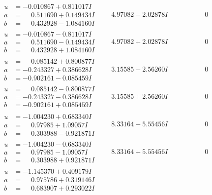 \documentclass[1p]{elsarticle_modified}
\theoremstyle{definition}
\begin{document}
$$\begin{array}{c|c|c}
\begin{aligned}
u &= -0.010867 + 0.811017 I \\
a &= \phantom{-}0.511690 + 0.149434 I \\
b &= \phantom{-}0.432928 - 1.084160 I\end{aligned}
 & \phantom{-}4.97082 - 2.02878 I & \phantom{-0.000000 } 0 \\ \hline\begin{aligned}
u &= -0.010867 - 0.811017 I \\
a &= \phantom{-}0.511690 - 0.149434 I \\
b &= \phantom{-}0.432928 + 1.084160 I\end{aligned}
 & \phantom{-}4.97082 + 2.02878 I & \phantom{-0.000000 } 0 \\ \hline\begin{aligned}
u &= \phantom{-}0.085142 + 0.800877 I \\
a &= -0.243327 + 0.386628 I \\
b &= -0.902161 - 0.085459 I\end{aligned}
 & \phantom{-}3.15585 - 2.56260 I & \phantom{-0.000000 } 0 \\ \hline\begin{aligned}
u &= \phantom{-}0.085142 - 0.800877 I \\
a &= -0.243327 - 0.386628 I \\
b &= -0.902161 + 0.085459 I\end{aligned}
 & \phantom{-}3.15585 + 2.56260 I & \phantom{-0.000000 } 0 \\ \hline\begin{aligned}
u &= -1.004230 + 0.683340 I \\
a &= \phantom{-}0.97985 + 1.09057 I \\
b &= \phantom{-}0.303988 - 0.921871 I\end{aligned}
 & \phantom{-}8.33164 - 5.55456 I & \phantom{-0.000000 } 0 \\ \hline\begin{aligned}
u &= -1.004230 - 0.683340 I \\
a &= \phantom{-}0.97985 - 1.09057 I \\
b &= \phantom{-}0.303988 + 0.921871 I\end{aligned}
 & \phantom{-}8.33164 + 5.55456 I & \phantom{-0.000000 } 0 \\ \hline\begin{aligned}
u &= -1.145370 + 0.409179 I \\
a &= \phantom{-}0.975786 + 0.319146 I \\
b &= \phantom{-}0.683907 + 0.293022 I\end{aligned}

\end{array}$$
\end{document}
